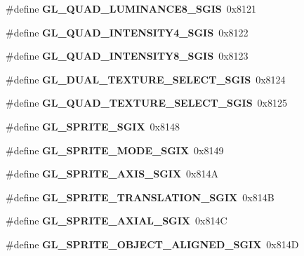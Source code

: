 \begin{DoxyCompactItemize}
\item 
\#define {\bfseries G\+L\+\_\+\+Q\+U\+A\+D\+\_\+\+L\+U\+M\+I\+N\+A\+N\+C\+E8\+\_\+\+S\+G\+I\+S}~0x8121\label{_s_d_l__opengl_8h_a251a281b9469184f436bfbc2832dc4da}

\item 
\#define {\bfseries G\+L\+\_\+\+Q\+U\+A\+D\+\_\+\+I\+N\+T\+E\+N\+S\+I\+T\+Y4\+\_\+\+S\+G\+I\+S}~0x8122\label{_s_d_l__opengl_8h_aa2aca4ccb48a25faec12bba8d76d4943}

\item 
\#define {\bfseries G\+L\+\_\+\+Q\+U\+A\+D\+\_\+\+I\+N\+T\+E\+N\+S\+I\+T\+Y8\+\_\+\+S\+G\+I\+S}~0x8123\label{_s_d_l__opengl_8h_adf605dd32fba377eeea3a69dc97ebb14}

\item 
\#define {\bfseries G\+L\+\_\+\+D\+U\+A\+L\+\_\+\+T\+E\+X\+T\+U\+R\+E\+\_\+\+S\+E\+L\+E\+C\+T\+\_\+\+S\+G\+I\+S}~0x8124\label{_s_d_l__opengl_8h_a6efd24f7e7a46e5777b68ff04e9a3ce9}

\item 
\#define {\bfseries G\+L\+\_\+\+Q\+U\+A\+D\+\_\+\+T\+E\+X\+T\+U\+R\+E\+\_\+\+S\+E\+L\+E\+C\+T\+\_\+\+S\+G\+I\+S}~0x8125\label{_s_d_l__opengl_8h_a1a1717df306ef395af2e0af72ee47f7a}

\item 
\#define {\bfseries G\+L\+\_\+\+S\+P\+R\+I\+T\+E\+\_\+\+S\+G\+I\+X}~0x8148\label{_s_d_l__opengl_8h_a2ee32c43bc3545278fd39b8701e75ed3}

\item 
\#define {\bfseries G\+L\+\_\+\+S\+P\+R\+I\+T\+E\+\_\+\+M\+O\+D\+E\+\_\+\+S\+G\+I\+X}~0x8149\label{_s_d_l__opengl_8h_a867e6fc6f926be668d419a84d6d24fb9}

\item 
\#define {\bfseries G\+L\+\_\+\+S\+P\+R\+I\+T\+E\+\_\+\+A\+X\+I\+S\+\_\+\+S\+G\+I\+X}~0x814\+A\label{_s_d_l__opengl_8h_ab69bfff9b80e01c51ebd185c2fafbc92}

\item 
\#define {\bfseries G\+L\+\_\+\+S\+P\+R\+I\+T\+E\+\_\+\+T\+R\+A\+N\+S\+L\+A\+T\+I\+O\+N\+\_\+\+S\+G\+I\+X}~0x814\+B\label{_s_d_l__opengl_8h_a568869f3e8340d5c606427e557a8ce29}

\item 
\#define {\bfseries G\+L\+\_\+\+S\+P\+R\+I\+T\+E\+\_\+\+A\+X\+I\+A\+L\+\_\+\+S\+G\+I\+X}~0x814\+C\label{_s_d_l__opengl_8h_a6201f2cb3f11bb75887d4478b1d80aa4}

\item 
\#define {\bfseries G\+L\+\_\+\+S\+P\+R\+I\+T\+E\+\_\+\+O\+B\+J\+E\+C\+T\+\_\+\+A\+L\+I\+G\+N\+E\+D\+\_\+\+S\+G\+I\+X}~0x814\+D\label{_s_d_l__opengl_8h_af75b54c2a204558bf7b71c9af5589c45}


\end{DoxyCompactItemize}
